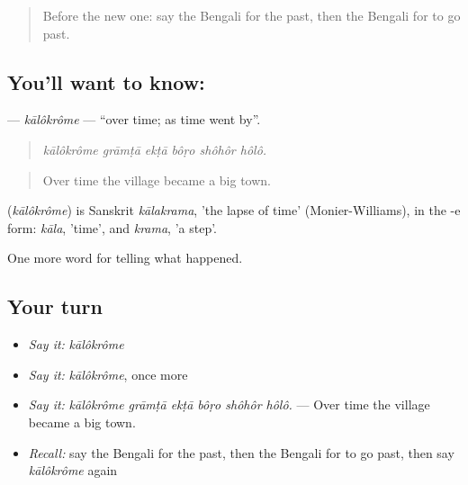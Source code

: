 \label{lesson:BN-C303-kalokrome}



\begin{quote}
Before the new one: say the Bengali for the past, then the Bengali for to go past.
\end{quote}

\subsection*{You'll want to know: }
\textbf{} — \emph{kālôkrôme} — \textquotedblleft{}over time; as time went by\textquotedblright{}.

\begin{quote}
     
\end{quote}

\begin{quote}
\emph{kālôkrôme grāmṭā ekṭā bôṛo shôhôr hôlô.}
\end{quote}

\begin{quote}
Over time the village became a big town.
\end{quote}

\begin{cousinweb}
\textbf{} (\emph{kālôkrôme}) is Sanskrit \emph{kālakrama}, 'the lapse of time' (Monier-Williams), in the -e form: \emph{kāla}, 'time', and \emph{krama}, 'a step'.
\end{cousinweb}

\begin{grammarlens}[title={What you've built}]
One more word for telling what happened.
\end{grammarlens}

\subsection*{Your turn}
\begin{itemize}
\raggedright
  \item \emph{Say it:} \emph{kālôkrôme}
  \item \emph{Say it:} \emph{kālôkrôme}, once more
  \item \emph{Say it:} \emph{kālôkrôme grāmṭā ekṭā bôṛo shôhôr hôlô.} — Over time the village became a big town.
  \item \emph{Recall:} say the Bengali for the past, then the Bengali for to go past, then say \emph{kālôkrôme} again
\end{itemize}

